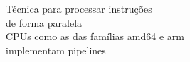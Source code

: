 \documentclass[preview]{standalone}
\begin{document}
Técnica para processar instruções\\de forma paralela\\CPUs como as das famílias amd64 e arm\\ implementam pipelines\\
\end{document}
